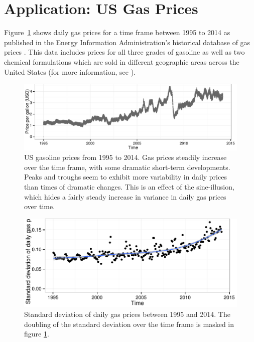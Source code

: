 \documentclass[11pt]{isuthesis}\usepackage[]{graphicx}\usepackage[]{color}
\newenvironment{knitrout}{}{} %
\begin{document}
\section{Application: US Gas Prices}
Figure~\ref{fig:gasprices} shows daily gas prices for a time frame between 1995 to 2014 as published in the Energy Information Administration's historical database of gas prices \citep{EIA}. This data includes prices for all three grades of gasoline as well as two chemical formulations which are sold in different geographic areas across the United States (for more information, see \citep{EIA-reformulated}). 

\begin{figure}[h!tbp]
\begin{knitrout}
\color{fgcolor}

{\centering \includegraphics[width=.98\linewidth]{Figure/sineIllusion/fig-gasprices-pictures-1} 

}



\end{knitrout}
\caption[US gasoline prices from 1995 to 2014]{US gasoline prices from 1995 to 2014. Gas prices steadily increase over the time frame, with some dramatic short-term developments. Peaks and troughs seem to exhibit more variability in daily prices than times of dramatic changes. This is an effect of the sine-illusion, which hides a fairly steady increase in variance in daily gas prices over time.}\label{fig:gasprices}
\end{figure}
\begin{figure}\centering
\begin{knitrout}
\color{fgcolor}

{\centering \includegraphics[width=.7\linewidth]{Figure/sineIllusion/fig-gaspricevariance-1} 

}



\end{knitrout}
\caption[Standard deviation of daily gas prices between 1995 and 2014. ]{Standard deviation of daily gas prices between 1995 and 2014. The doubling of the standard deviation over the time frame is masked in figure \ref{fig:gasprices}.\label{fig:gasvariance}}
\end{figure}
\end{document}
